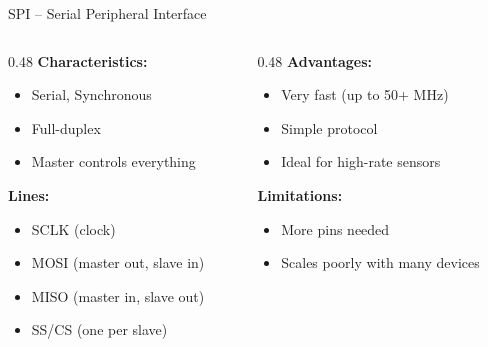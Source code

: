 \documentclass[aspectratio=169,11pt]{beamer}
\begin{document}
\begin{frame}{SPI -- Serial Peripheral Interface}
    \begin{columns}[T]
        \begin{column}{0.48\textwidth}
            \textbf{Characteristics:}
            \begin{itemize}
                \item Serial, Synchronous
                \item Full-duplex
                \item Master controls everything
            \end{itemize}
            
            \vspace{0.3cm}
            \textbf{Lines:}
            \begin{itemize}
                \item SCLK (clock)
                \item MOSI (master out, slave in)
                \item MISO (master in, slave out)
                \item SS/CS (one per slave)
            \end{itemize}
        \end{column}
        \begin{column}{0.48\textwidth}
            \textbf{Advantages:}
            \begin{itemize}
                \item Very fast (up to 50+ MHz)
                \item Simple protocol
                \item Ideal for high-rate sensors
            \end{itemize}
            
            \vspace{0.3cm}
            \textbf{Limitations:}
            \begin{itemize}
                \item More pins needed
                \item Scales poorly with many devices
            \end{itemize}
        \end{column}
    \end{columns}
    
    \vspace{0.3cm}
    \footnotesize
    \cite{wolf2012computers}
\end{frame}
\end{document}
